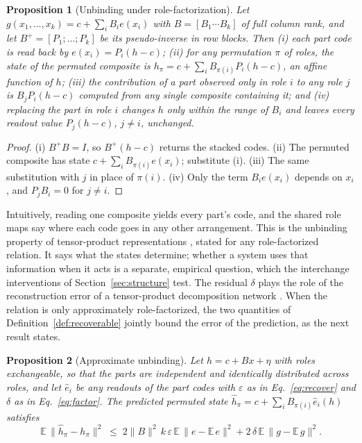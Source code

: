 \documentclass[10pt]{article}
\theoremstyle{plain}
\newtheorem{proposition}{Proposition}
\theoremstyle{remark}
\begin{document}
\begin{proposition}[Unbinding under role-factorization]
\label{prop:systematic}
Let $g(x_1, \ldots, x_k) = c + \sum_i B_i e(x_i)$ with $B = [B_1 \cdots B_k]$ of full column rank, and let $B^{+} = [P_1; \ldots; P_k]$ be its pseudo-inverse in row blocks. Then (i) each part code is read back by $e(x_i) = P_i(h - c)$; (ii) for any permutation $\pi$ of roles, the state of the permuted composite is $h_\pi = c + \sum_i B_{\pi(i)} P_i (h - c)$, an affine function of $h$; (iii) the contribution of a part observed only in role $i$ to any role $j$ is $B_j P_i (h - c)$ computed from any single composite containing it; and (iv) replacing the part in role $i$ changes $h$ only within the range of $B_i$ and leaves every readout value $P_j(h - c)$, $j \ne i$, unchanged.
\end{proposition}

\begin{proof}
(i) $B^{+}B = I$, so $B^{+}(h - c)$ returns the stacked codes. (ii) The permuted composite has state $c + \sum_i B_{\pi(i)} e(x_i)$; substitute (i). (iii) The same substitution with $j$ in place of $\pi(i)$. (iv) Only the term $B_i e(x_i)$ depends on $x_i$, and $P_j B_i = 0$ for $j \neq i$.
\end{proof}

\noindent
Intuitively, reading one composite yields every part's code, and the shared role maps say where each code goes in any other arrangement. This is the unbinding property of tensor-product representations \citep{smolensky1990}, stated for any role-factorized relation. It says what the states determine; whether a system uses that information when it acts is a separate, empirical question, which the interchange interventions of Section~\ref{sec:structure} test. The residual $\delta$ plays the role of the reconstruction error of a tensor-product decomposition network \citep{mccoy2019}. When the relation is only approximately role-factorized, the two quantities of Definition~\ref{def:recoverable} jointly bound the error of the prediction, as the next result states.

\begin{proposition}[Approximate unbinding]
\label{prop:approx}
Let $h = c + Bx + \eta$ with roles exchangeable, so that the parts are independent and identically distributed across roles, and let $\hat{e}_i$ be any readouts of the part codes with $\varepsilon$ as in Eq.~\eqref{eq:recover} and $\delta$ as in Eq.~\eqref{eq:factor}. The predicted permuted state $\hat{h}_\pi = c + \sum_i B_{\pi(i)}\hat{e}_i(h)$ satisfies
\begin{equation}
  \mathbb{E}\,\lVert \hat{h}_\pi - h_\pi \rVert^2 \;\le\; 2\lVert B \rVert^2\, k\,\varepsilon\, \mathbb{E}\,\lVert e - \mathbb{E}\,e \rVert^2 + 2\,\delta\, \mathbb{E}\,\lVert g - \mathbb{E}\,g \rVert^2 .
\end{equation}
\end{proposition}
\end{document}

